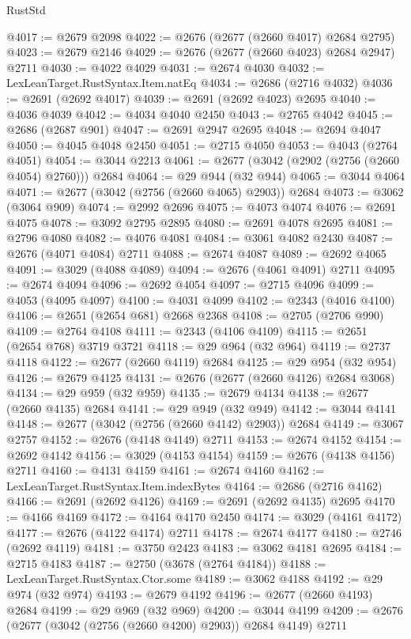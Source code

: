 \begin{lexlean}{RustStd}
\begin{coremodule}
{\begin{coremodule}
{{{{{{{{{{{{{{{{{{{{{{{{{{{{{{{{{{{{{{{{{{{{{{{{{{{{{{{@4017 := @2679 @2098
@4022 := @2676 (@2677 (@2660 @4017) @2684 @2795)
@4023 := @2679 @2146
@4029 := @2676 (@2677 (@2660 @4023) @2684 @2947) @2711
@4030 := @4022 @4029
@4031 := @2674 @4030
@4032 := LexLeanTarget.RustSyntax.Item.natEq
@4034 := @2686 (@2716 @4032)
@4036 := @2691 (@2692 @4017)
@4039 := @2691 (@2692 @4023) @2695
@4040 := @4036 @4039
@4042 := @4034 @4040 @2450
@4043 := @2765 @4042
@4045 := @2686 (@2687 @901)
@4047 := @2691 @2947 @2695
@4048 := @2694 @4047
@4050 := @4045 @4048 @2450
@4051 := @2715 @4050
@4053 := @4043 (@2764 @4051)
@4054 := @3044 @2213
@4061 := @2677 (@3042 (@2902 (@2756 (@2660 @4054) @2760))) @2684
@4064 := @29 @944 (@32 @944)
@4065 := @3044 @4064
@4071 := @2677 (@3042 (@2756 (@2660 @4065) @2903)) @2684
@4073 := @3062 (@3064 @909)
@4074 := @2992 @2696
@4075 := @4073 @4074
@4076 := @2691 @4075
@4078 := @3092 @2795 @2895
@4080 := @2691 @4078 @2695
@4081 := @2796 @4080
@4082 := @4076 @4081
@4084 := @3061 @4082 @2430
@4087 := @2676 (@4071 @4084) @2711
@4088 := @2674 @4087
@4089 := @2692 @4065
@4091 := @3029 (@4088 @4089)
@4094 := @2676 (@4061 @4091) @2711
@4095 := @2674 @4094
@4096 := @2692 @4054
@4097 := @2715 @4096
@4099 := @4053 (@4095 @4097)
@4100 := @4031 @4099
@4102 := @2343 (@4016 @4100)
@4106 := @2651 (@2654 @681) @2668 @2368
@4108 := @2705 (@2706 @990)
@4109 := @2764 @4108
@4111 := @2343 (@4106 @4109)
@4115 := @2651 (@2654 @768) @3719 @3721
@4118 := @29 @964 (@32 @964)
@4119 := @2737 @4118
@4122 := @2677 (@2660 @4119) @2684
@4125 := @29 @954 (@32 @954)
@4126 := @2679 @4125
@4131 := @2676 (@2677 (@2660 @4126) @2684 @3068)
@4134 := @29 @959 (@32 @959)
@4135 := @2679 @4134
@4138 := @2677 (@2660 @4135) @2684
@4141 := @29 @949 (@32 @949)
@4142 := @3044 @4141
@4148 := @2677 (@3042 (@2756 (@2660 @4142) @2903)) @2684
@4149 := @3067 @2757
@4152 := @2676 (@4148 @4149) @2711
@4153 := @2674 @4152
@4154 := @2692 @4142
@4156 := @3029 (@4153 @4154)
@4159 := @2676 (@4138 @4156) @2711
@4160 := @4131 @4159
@4161 := @2674 @4160
@4162 := LexLeanTarget.RustSyntax.Item.indexBytes
@4164 := @2686 (@2716 @4162)
@4166 := @2691 (@2692 @4126)
@4169 := @2691 (@2692 @4135) @2695
@4170 := @4166 @4169
@4172 := @4164 @4170 @2450
@4174 := @3029 (@4161 @4172)
@4177 := @2676 (@4122 @4174) @2711
@4178 := @2674 @4177
@4180 := @2746 (@2692 @4119)
@4181 := @3750 @2423
@4183 := @3062 @4181 @2695
@4184 := @2715 @4183
@4187 := @2750 (@3678 (@2764 @4184))
@4188 := LexLeanTarget.RustSyntax.Ctor.some
@4189 := @3062 @4188
@4192 := @29 @974 (@32 @974)
@4193 := @2679 @4192
@4196 := @2677 (@2660 @4193) @2684
@4199 := @29 @969 (@32 @969)
@4200 := @3044 @4199
@4209 := @2676 (@2677 (@3042 (@2756 (@2660 @4200) @2903)) @2684 @4149) @2711
}}}}}}}}}}}}}}}}}}}}}}}}}}}}}}}}}}}}}}}}}}}}}}}}}}}}}}}
\end{coremodule}}
\end{coremodule}
\end{lexlean}
